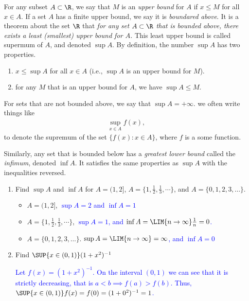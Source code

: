\documentclass[10pt,a4paper]{report}
\newcommand{\BLUE}[1]{\textcolor{blue}{#1}}
\begin{document}
\begin{enumerate}[label=\Roman*.]
For any subset $A \subset \R$, we say that $M$ is an \textit{upper bound} for $A$ if $x \le M$ for all $x \in A$.  If a set $A$ has a finite upper bound, we say it is \textit{boundared above}.  It is a theorem about the set $\R$ that \textit{for any set $A \subset \R$ that is bounded above, there exists a least (smallest) upper bound for $A$.}  This least upper bound is called supermum of $A$, and denoted $\sup A$.  By definition, the number $\sup A$ has two properties.
\begin{enumerate}[label = (\roman*)]
\item $x \le \sup A$ for all $x \in A$ (i.e., $\sup A$ is an upper bound for $M$).
\item for any $M$ that is an upper bound for $A$, we have $\sup A \le M$.
\end{enumerate}For sets that are not bounded above, we say that $\sup A = + \infty$.  we often write things like 
\begin{align*}
	\sup_{x \in A} f(x),
\end{align*}to denote the supremum of the set $\{ f(x): x \in A\}$, where $f$ is a some function.

Similarly, any set that is bounded below has a \textit{greatest lower bound} called the \textit{infimum}, denoted $\inf A$.  It satisfies the same properties as $\sup A$ with the inequalities reversed.
\begin{enumerate}[label=(\alph*)]

\item Find $\sup A$ and $\inf A$ for $A = (1,2]$, $A=\{1,\frac{1}{2},\frac{1}{3}, \cdots \}$, and $A = \{0,1,2,3,\dots\}$.

\begin{itemize}
\item $A = (1,2]$, \BLUE{ $\sup A = 2$ and $\inf A = 1$ }
\item $A=\{1,\frac{1}{2},\frac{1}{3}, \cdots \}$, \BLUE{ $\sup A = 1$, and $\inf A = \LIM{n\to \infty} \frac{1}{n} = 0$.}
\item $A = \{0,1,2,3,\dots\}$.  \BLUE{ $\sup A = \LIM{n\to \infty} = \infty$, and $\inf A = 0$}
\end{itemize}

\item Find $\SUP{x \in (0, 1)}(1+x^2)^{-1}$

\BLUE{ Let $f(x) = (1+x^2)^{-1}$.  On the interval $(0,1)$ we can see that it is strictly decreasing, that is $a<b \implies f(a)> f(b)$.  Thus, $\SUP{x \in (0, 1)}f(x) = f(0) = (1+0^2)^{-1} = 1$.}


\end{enumerate}
\end{enumerate}
\end{document}
